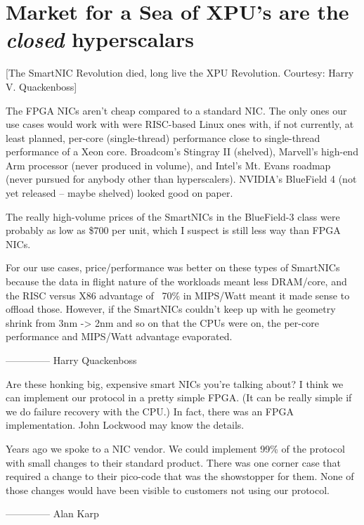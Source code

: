 \documentclass[../../../OAE-SPEC-MAIN.tex]{subfiles}
\begin{document}
\section{Market for a Sea of XPU's are the \emph{closed} hyperscalars}

[The SmartNIC Revolution died, long live the XPU Revolution. Courtesy: Harry V. Quackenboss]

 
The FPGA NICs aren’t cheap compared to a standard NIC.  The only ones our use cases would work with were RISC-based Linux ones with, if not currently, at least planned, per-core (single-thread) performance close to single-thread performance of a Xeon core. Broadcom’s Stingray II (shelved), Marvell’s high-end Arm processor (never produced in volume), and Intel’s Mt. Evans roadmap (never pursued for anybody other than hyperscalers).  NVIDIA’s BlueField 4 (not yet released – maybe shelved) looked good on paper.
 
The really high-volume prices of the SmartNICs in the BlueField-3 class were probably as low as \$700 per unit, which I suspect is still less way than FPGA NICs.
 
For our use cases, price/performance was better on these types of SmartNICs because the data in flight nature of the workloads meant less DRAM/core, and the RISC versus X86 advantage of ~70\% in MIPS/Watt meant it made sense to offload those. However, if the SmartNICs couldn’t keep up with he geometry shrink from 3nm -> 2nm and so on that the CPUs were on, the per-core performance and MIPS/Watt advantage evaporated.
 
 --------------
Harry Quackenboss


\bigskip

 
Are these honking big, expensive smart NICs you're talking about?  I think we can implement our protocol in a pretty simple FPGA.  (It can be really simple if we do failure recovery with the CPU.)  In fact, there was an FPGA implementation.  John Lockwood may know the details.
 
Years ago we spoke to a NIC vendor.  We could implement 99\% of the protocol with small changes to their standard product.  There was one corner case that required a change to their pico-code that was the showstopper for them.  None of those changes would have been visible to customers not using our protocol.

--------------
Alan Karp
 
\bigskip

\end{document}

